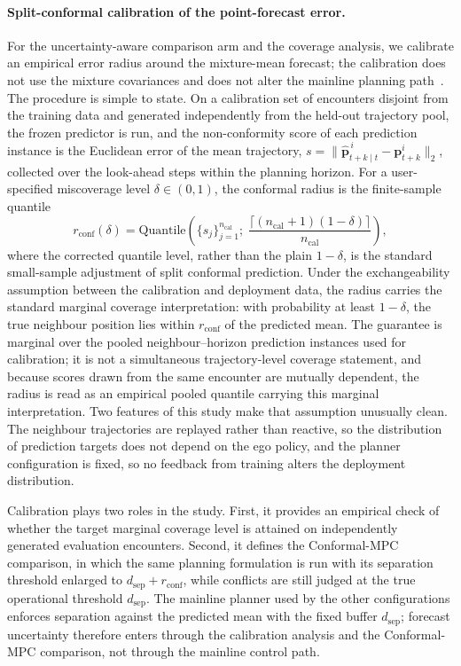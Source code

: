 \documentclass[11pt]{article}
\theoremstyle{plain}
\theoremstyle{definition}
\begin{document}
\paragraph{Split-conformal calibration of the point-forecast error.}
For the uncertainty-aware comparison arm and the coverage analysis, we
calibrate an empirical error radius around the mixture-mean forecast;
the calibration does not use the mixture covariances and does not
alter the mainline planning path~\citep{lindemann2023safe}. The
procedure is simple to state. On a calibration set of encounters
disjoint from the training data and generated independently from the
held-out trajectory pool, the frozen predictor is run, and the
non-conformity score of each prediction instance is the Euclidean
error of the mean trajectory,
$s = \| \hat{\bm{p}}^{\,i}_{t+k \mid t} - \bm{p}^{i}_{t+k} \|_2$,
collected over the look-ahead steps within the planning horizon. For a
user-specified miscoverage level $\delta \in (0,1)$, the conformal
radius is the finite-sample quantile
\begin{equation}
	\label{eq:conformal-radius}
	r_{\mathrm{conf}}(\delta)
	= \mathrm{Quantile}\!\left(
	\{ s_j \}_{j=1}^{n_{\mathrm{cal}}};\;
	\frac{\lceil (n_{\mathrm{cal}} + 1)(1 - \delta) \rceil}
	{n_{\mathrm{cal}}}
	\right),
\end{equation}
where the corrected quantile level, rather than the plain
$1 - \delta$, is the standard small-sample adjustment of split
conformal prediction. Under the exchangeability assumption between the
calibration and deployment data, the radius carries the standard
marginal coverage interpretation: with probability at least
$1 - \delta$, the true neighbour position lies within
$r_{\mathrm{conf}}$ of the predicted mean. The guarantee is marginal
over the pooled neighbour--horizon prediction instances used for
calibration; it is not a simultaneous trajectory-level coverage
statement, and because scores drawn from the same encounter are
mutually dependent, the radius is read as an empirical pooled quantile
carrying this marginal interpretation. Two features of this study make that assumption unusually clean.
The neighbour trajectories are replayed rather than reactive, so the
distribution of prediction targets does not depend on the ego policy,
and the planner configuration is fixed, so no feedback from training
alters the deployment distribution.
 
Calibration plays two roles in the study. First, it provides an
empirical check of whether the target marginal coverage level is
attained on independently generated evaluation encounters. Second, it
defines the Conformal-MPC comparison, in which the same planning
formulation is run with its separation threshold enlarged to
$d_{\mathrm{sep}}+r_{\mathrm{conf}}$, while conflicts are still judged
at the true operational threshold $d_{\mathrm{sep}}$. The mainline
planner used by the other configurations enforces separation against
the predicted mean with the fixed buffer $d_{\mathrm{sep}}$; forecast
uncertainty therefore enters through the calibration analysis and the
Conformal-MPC comparison, not through the mainline control path.
 
\end{document}
